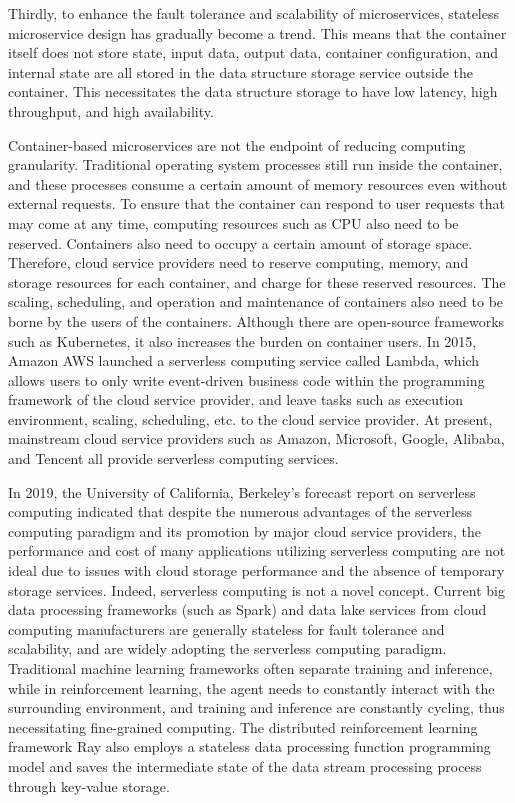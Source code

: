 Thirdly, to enhance the fault tolerance and scalability of microservices, stateless microservice design has gradually become a trend. This means that the container itself does not store state, input data, output data, container configuration, and internal state are all stored in the data structure storage service outside the container. This necessitates the data structure storage to have low latency, high throughput, and high availability.

Container-based microservices are not the endpoint of reducing computing granularity. Traditional operating system processes still run inside the container, and these processes consume a certain amount of memory resources even without external requests. To ensure that the container can respond to user requests that may come at any time, computing resources such as CPU also need to be reserved. Containers also need to occupy a certain amount of storage space. Therefore, cloud service providers need to reserve computing, memory, and storage resources for each container, and charge for these reserved resources. The scaling, scheduling, and operation and maintenance of containers also need to be borne by the users of the containers. Although there are open-source frameworks such as Kubernetes, it also increases the burden on container users. In 2015, Amazon AWS launched a serverless computing service called Lambda, which allows users to only write event-driven business code within the programming framework of the cloud service provider, and leave tasks such as execution environment, scaling, scheduling, etc. to the cloud service provider. At present, mainstream cloud service providers such as Amazon, Microsoft, Google, Alibaba, and Tencent all provide serverless computing services.

In 2019, the University of California, Berkeley's forecast report on serverless computing indicated that despite the numerous advantages of the serverless computing paradigm and its promotion by major cloud service providers, the performance and cost of many applications utilizing serverless computing are not ideal due to issues with cloud storage performance and the absence of temporary storage services. 
Indeed, serverless computing is not a novel concept. 
Current big data processing frameworks (such as Spark) and data lake services from cloud computing manufacturers are generally stateless for fault tolerance and scalability, and are widely adopting the serverless computing paradigm. 
Traditional machine learning frameworks often separate training and inference, while in reinforcement learning, the agent needs to constantly interact with the surrounding environment, and training and inference are constantly cycling, thus necessitating fine-grained computing. 
The distributed reinforcement learning framework Ray also employs a stateless data processing function programming model and saves the intermediate state of the data stream processing process through key-value storage.

